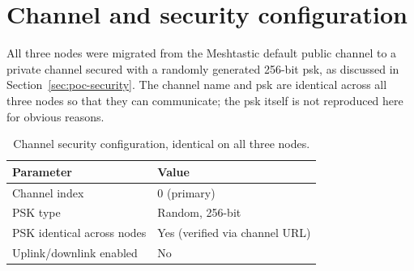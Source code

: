 \section{Channel and security configuration}%
\label{sec:bijlage-config-security}

All three nodes were migrated from the Meshtastic default public channel to a private
channel secured with a randomly generated 256-bit \gls{psk}, as discussed in
Section~\ref{sec:poc-security}. The channel name and \gls{psk} are identical across all three
nodes so that they can communicate; the \gls{psk} itself is not reproduced here for obvious
reasons.

\begin{table}[H]
  \centering
  \small
  \begin{tabular}{ll}
    \toprule
    \textbf{Parameter} & \textbf{Value} \\
    \midrule
    Channel index         & 0 (primary) \\
    PSK type              & Random, 256-bit \\
    PSK identical across nodes & Yes (verified via channel URL) \\
    Uplink/downlink enabled & No \\
    \bottomrule
  \end{tabular}
  \caption[Channel security configuration]{\label{tab:bijlage-security}Channel security configuration, identical on all three nodes.}
\end{table}